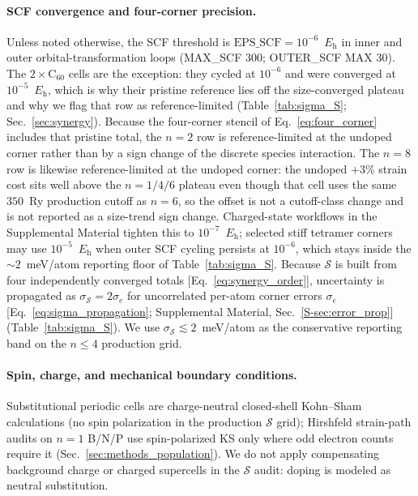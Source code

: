 \documentclass[%
 reprint,
 groupedaddress,
 amsmath,amssymb,
 aps,
 prb,
 floatfix,
]{revtex4-2}
\begin{document}
\paragraph{SCF convergence and four-corner precision.}
Unless noted otherwise, the SCF threshold is $\mathrm{EPS\_SCF}=10^{-6}$~$E_{\mathrm{h}}$ in inner and outer orbital-transformation loops (MAX\_SCF 300; OUTER\_SCF MAX 30).
The $2\times\mathrm{C}_{60}$ cells are the exception: they cycled at $10^{-6}$ and were converged at $10^{-5}$~$E_{\mathrm{h}}$, which is why their pristine reference lies off the size-converged plateau and why we flag that row as reference-limited (Table~\ref{tab:sigma_S}; Sec.~\ref{sec:synergy}).
Because the four-corner stencil of Eq.~\eqref{eq:four_corner} includes that pristine total, the $n{=}2$ row is reference-limited at the undoped corner rather than by a sign change of the discrete species interaction.
The $n{=}8$ row is likewise reference-limited at the undoped corner: the undoped $+3$\% strain cost sits well above the $n{=}1/4/6$ plateau even though that cell uses the same $350$~Ry production cutoff as $n{=}6$, so the offset is not a cutoff-class change and is not reported as a size-trend sign change.
Charged-state workflows in the Supplemental Material tighten this to $10^{-7}$~$E_{\mathrm{h}}$; selected stiff tetramer corners may use $10^{-5}$~$E_{\mathrm{h}}$ when outer SCF cycling persists at $10^{-6}$, which stays inside the ${\sim}2$~meV/atom reporting floor of Table~\ref{tab:sigma_S}.
Because $\mathcal{S}$ is built from four independently converged totals [Eq.~\eqref{eq:synergy_order}], uncertainty is propagated as $\sigma_{\mathcal{S}}=2\sigma_e$ for uncorrelated per-atom corner errors $\sigma_e$ [Eq.~\eqref{eq:sigma_propagation}; Supplemental Material, Sec.~\ref{S-sec:error_prop}] (Table~\ref{tab:sigma_S}).
We use $\sigma_{\mathcal{S}}\lesssim 2$~meV/atom as the conservative reporting band on the $n\leq 4$ production grid.

\paragraph{Spin, charge, and mechanical boundary conditions.}
Substitutional periodic cells are charge-neutral closed-shell Kohn--Sham calculations (no spin polarization in the production $\mathcal{S}$ grid); Hirshfeld strain-path audits on $n{=}1$ B/N/P use spin-polarized KS only where odd electron counts require it (Sec.~\ref{sec:methods_population}).
We do not apply compensating background charge or charged supercells in the $\mathcal{S}$ audit: doping is modeled as neutral substitution.
\end{document}
